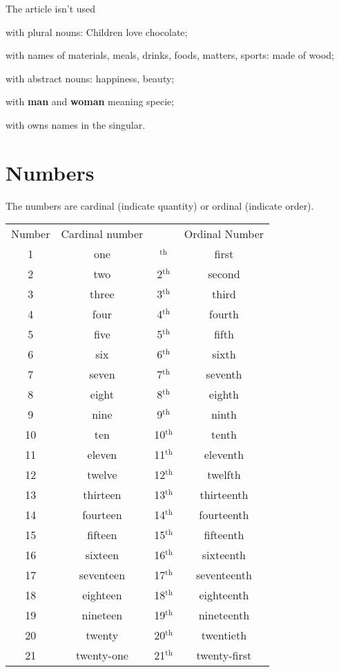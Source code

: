 \documentclass[a4paper, titlepage]{article}
\begin{document}
The article isn't used
\begin{list}
	\item with plural nouns: Children love chocolate;
	\item with names of materials, meals, drinks, foods, matters, sports: made of wood;
	\item with abstract nouns: happiness, beauty;
	\item with \textbf{man} and \textbf{woman} meaning specie;
	\item with owns names in the singular.
\end{list}
\section{Numbers}
The numbers are cardinal (indicate quantity) or ordinal (indicate order).
\begin{tabular}{cccc}
Number& Cardinal number&&Ordinal Number\\
1&one&$^{\text{th}}$&first\\
2&two&2$^{\text{th}}$&second\\
3&three&3$^{\text{th}}$&third\\
4&four&4$^{\text{th}}$&fourth\\
5&five&5$^{\text{th}}$&fifth\\
6&six&6$^{\text{th}}$&sixth\\
7&seven&7$^{\text{th}}$&seventh\\
8&eight&8$^{\text{th}}$&eighth\\
9&nine&9$^{\text{th}}$&ninth\\
10&ten&10$^{\text{th}}$&tenth\\
11&eleven&11$^{\text{th}}$&eleventh\\
12&twelve&12$^{\text{th}}$&twelfth\\
13&thirteen&13$^{\text{th}}$&thirteenth\\
14&fourteen&14$^{\text{th}}$&fourteenth\\
15&fifteen&15$^{\text{th}}$&fifteenth\\
16&sixteen&16$^{\text{th}}$&sixteenth\\
17&seventeen&17$^{\text{th}}$&seventeenth\\
18&eighteen&18$^{\text{th}}$&eighteenth\\
19&nineteen&19$^{\text{th}}$&nineteenth\\
20&twenty&20$^{\text{th}}$&twentieth\\
21&twenty-one&21$^{\text{th}}$&twenty-first\\

\end{tabular}
\end{document}
